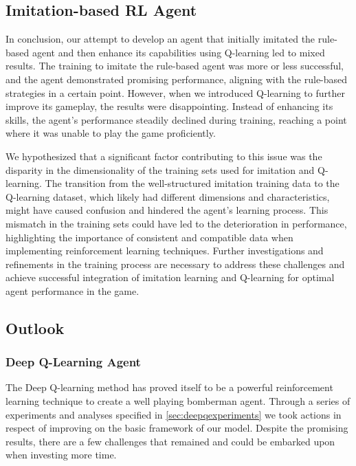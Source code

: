 \subsection{Imitation-based RL Agent}

In conclusion, our attempt to develop an agent that initially imitated the rule-based agent and then enhance its capabilities using Q-learning led 
to mixed results. The training to imitate the rule-based agent was more or less successful, and the agent demonstrated promising performance, aligning with the rule-based 
strategies in a certain point. However, when we introduced Q-learning to further improve its gameplay, the results were disappointing. Instead of enhancing its skills, 
the agent's performance steadily declined during training, reaching a point where it was unable to play the game proficiently.

We hypothesized that a significant factor contributing to this issue was the disparity in the dimensionality of the training sets 
used for imitation and Q-learning. The transition from the well-structured imitation training data to the Q-learning dataset, which likely 
had different dimensions and characteristics, might have caused confusion and hindered the agent's learning process. This mismatch in the training sets 
could have led to the deterioration in performance, highlighting the importance of consistent and compatible data when implementing reinforcement learning techniques. 
Further investigations and refinements in the training process are necessary to address these challenges and achieve successful integration of imitation learning and
Q-learning for optimal agent performance in the game.

\subsection{Outlook}

\subsubsection{Deep Q-Learning Agent}

The Deep Q-learning method has proved itself to be a powerful reinforcement learning technique to create a well playing bomberman agent. Through a series of experiments and analyses specified in \ref{sec:deepqexperiments} we took actions in respect of improving on the basic framework of our model. Despite the promising results, there are a few challenges that remained and could be embarked upon when investing more time. \\

